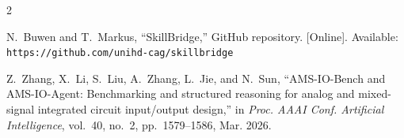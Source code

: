 \documentclass[lettersize,journal]{ieee_template/IEEEtran}
\begin{document}
\begin{thebibliography}{2}

N.~Buwen and T.~Markus, ``SkillBridge,'' GitHub repository. [Online]. Available: \texttt{https://github.com/unihd-cag/skillbridge}

Z.~Zhang, X.~Li, S.~Liu, A.~Zhang, L.~Jie, and N.~Sun, ``AMS-IO-Bench and AMS-IO-Agent: Benchmarking and structured reasoning for analog and mixed-signal integrated circuit input/output design,'' in \emph{Proc. AAAI Conf. Artificial Intelligence}, vol.~40, no.~2, pp.~1579--1586, Mar. 2026.

\end{thebibliography}
\end{document}
